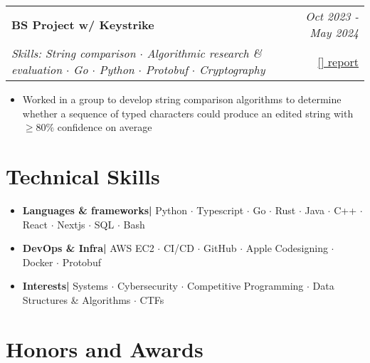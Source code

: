 \documentclass{article}
\makeatletter
\newcommand{\resumeItem}[2]{
  \item{
    \textbf{#1}{\hspace{0.5mm}#2 \vspace{-0.5mm}}
  }
}
\newcommand{\resumeProject}[4]{
\vspace{0.5mm}
    \begin{tabular*}{0.98\textwidth}[t]{l@{\extracolsep{\fill}}r}
        \textbf{#1} & \textit{\footnotesize{#3}} \\
        \footnotesize{\textit{#2}} & \footnotesize{#4}
    \end{tabular*}
    \vspace{-2.4mm}
}
\newcommand{\resumeSubItem}[2]{\resumeItem{#1}{#2}\vspace{-4pt}}
\newcommand{\resumeSubHeadingListStart}{}
\newcommand{\resumeHeadingSkillStart}{\begin{itemize}[leftmargin=*,itemsep=1.7mm, rightmargin=2ex]}
\newcommand{\resumeItemListStart}{\begin{itemize}[leftmargin=*,labelsep=1mm,itemsep=0.5mm]\normalsize}
\newcommand{\resumeSubHeadingListEnd}{}
\newcommand{\resumeHeadingSkillEnd}{\end{itemize}\vspace{-2mm}}
\newcommand{\resumeItemListEnd}{\end{itemize}\vspace{-2mm}}
\newcommand{\socialicon}[1]{\raisebox{-0.05em}{\resizebox{!}{1em}{#1}}}
\makeatother
\begin{document}
\resumeProject
  {BS Project w/ Keystrike}
  {Skills: String comparison $\cdot$ Algorithmic research \& evaluation $\cdot$ Go $\cdot$ Python $\cdot$ Protobuf $\cdot$ Cryptography}
  {Oct 2023 - May 2024}
  {{}\href{https://skemman.is/bitstream/1946/47651/1/Reykjavik_University_Keystrike_Final_Report.pdf}{[\textcolor{black}{\faFile}] report}}
\resumeItemListStart

  \item Worked in a group to develop string comparison algorithms to determine whether a sequence of typed characters could produce an edited string with $\ge 80\%$ confidence on average
\resumeItemListEnd


\resumeSubHeadingListEnd

\vspace{-3mm}
\section{\textbf{Technical Skills}}
 \resumeHeadingSkillStart
 \resumeSubItem{Languages \& frameworks| }
    {Python $\cdot$ Typescript $\cdot$ Go $\cdot$ Rust $\cdot$ Java $\cdot$ C++ $\cdot$ React $\cdot$ Nextjs $\cdot$ SQL $\cdot$ Bash}

	\resumeSubItem{DevOps \& Infra| }
    {AWS EC2 $\cdot$ CI/CD $\cdot$ GitHub $\cdot$ Apple Codesigning $\cdot$ Docker $\cdot$ Protobuf}

	\resumeSubItem{Interests| }
	{Systems $\cdot$ Cybersecurity $\cdot$ Competitive Programming $\cdot$ Data Structures \& Algorithms $\cdot$ CTFs}
 \resumeHeadingSkillEnd

 \vspace{-2mm}
\section{\textbf{Honors and Awards}}
\vspace{-0.4mm}
\resumeSubHeadingListStart
\end{document}
